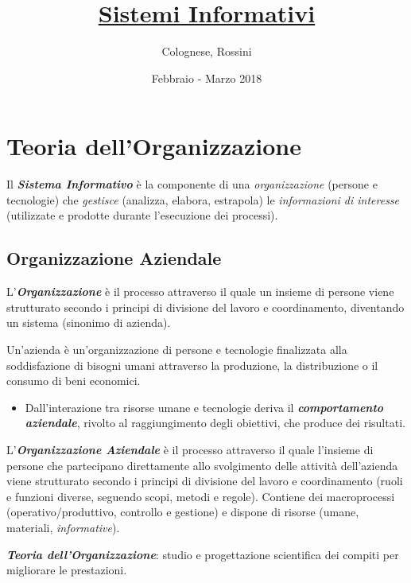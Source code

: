 \documentclass[a4paper, notitlepage, 9pt]{extreport}
\makeatletter
\newcommand*{\toccontents}{\@starttoc{toc}}
\makeatother
\begin{document}
	\title{\textbf{\underline{Sistemi Informativi}}}
	\date{Febbraio - Marzo 2018}
	\author{Colognese, Rossini}
	\maketitle
	
	\toccontents

\chapter*{Teoria dell'Organizzazione}
Il \textit{\textbf{Sistema Informativo}} è la componente di una \textit{organizzazione} (persone e tecnologie) che \textit{gestisce} (analizza, elabora, estrapola) le \textit{informazioni di interesse} (utilizzate e prodotte durante l'esecuzione dei processi).

\section*{Organizzazione Aziendale}
L'\textit{\textbf{Organizzazione}} è il processo attraverso il quale un insieme di persone viene strutturato secondo i principi di divisione del lavoro e coordinamento, diventando un sistema (sinonimo di azienda).

Un'azienda è un'organizzazione di persone e tecnologie finalizzata alla soddisfazione di bisogni umani attraverso la produzione, la distribuzione o il consumo di beni economici.
\begin{itemize}
	\item Dall'interazione tra risorse umane e tecnologie deriva il \textit{\textbf{comportamento aziendale}}, rivolto al raggiungimento degli obiettivi, che produce dei risultati.
\end{itemize}

\noindent
L'\textit{\textbf{Organizzazione Aziendale}} è il processo attraverso il quale l'insieme di persone che partecipano direttamente allo svolgimento delle attività dell'azienda viene strutturato secondo i principi di divisione del lavoro e coordinamento (ruoli e funzioni diverse, seguendo scopi, metodi e regole). Contiene dei macroprocessi (operativo/produttivo, controllo e gestione) e dispone di risorse (umane, materiali, \textit{informative}).

\noindent
\textit{\textbf{Teoria dell'Organizzazione}}: studio e progettazione scientifica dei compiti per
migliorare le prestazioni.
\end{document}
